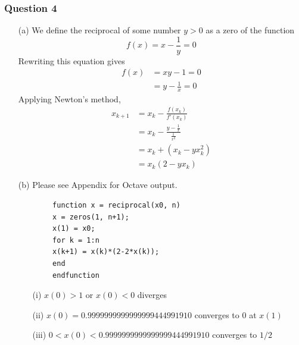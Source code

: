 \documentclass[11pt,a4paper]{article}
\begin{document}
\subsubsection*{Question 4} 
\begin{enumerate}
	\item[(a)] We define the reciprocal of some number $y>0$ as a zero of the function 
		$$f(x)=x-\frac{1}{y}=0$$
		Rewriting this equation gives
		\begin{align*}
			f(x)&=xy-1=0 \\
			&=y-\frac{1}{x}=0
		\end{align*}
		Applying Newton's method,
		\begin{align*}
			x_{k+1}&=x_k-\frac{f(x_k)}{f'(x_k)} \\
			&=x_k-\frac{y-\frac{1}{x}}{\frac{1}{x^2}} \\
			&=x_k+(x_k-yx^2_k) \\
			&=x_k(2-yx_k)
		\end{align*}
	\item[(b)] Please see Appendix for Octave output.
	\begin{verbatim}
		function x = reciprocal(x0, n)
		x = zeros(1, n+1);
		x(1) = x0;
		for k = 1:n
		x(k+1) = x(k)*(2-2*x(k));
		end
		endfunction
	\end{verbatim}
	
	\begin{enumerate}
		\item[(i)] $x(0)>1$ or $x(0)<0$ diverges
		\item[(ii)] $x(0)=0.9999999999999999444991910$ converges to 0 at $x(1)$
		\item[(iii)] $0<x(0)<0.9999999999999999444991910$ converges to $1/2$
	\end{enumerate}
\end{enumerate}

\pagebreak
\end{document}

